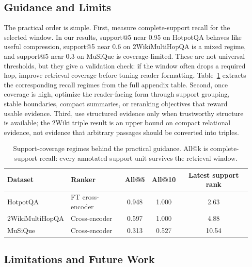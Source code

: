 \documentclass[a4paper,fleqn]{cas-sc}
\begin{document}
\subsection{Guidance and Limits}

The practical order is simple. First, measure complete-support recall for the
selected window. In our results, support@5 near 0.95 on HotpotQA behaves like
useful compression, support@5 near 0.6 on 2WikiMultiHopQA is a mixed regime,
and support@5 near 0.3 on MuSiQue is coverage-limited. These are not universal
thresholds, but they give a validation check: if the window often drops a
required hop, improve retrieval coverage before tuning reader formatting.
Table~\ref{tab:coverage-regimes} extracts the corresponding recall regimes
from the full appendix table. Second, once coverage is high, optimize the
reader-facing form through support grouping, stable boundaries, compact
summaries, or reranking objectives that reward usable evidence. Third, use
structured evidence only when trustworthy structure is available; the 2Wiki
triple result is an upper bound on compact relational evidence, not evidence
that arbitrary passages should be converted into triples.

\begin{table}[!t]
\centering
\caption{Support-coverage regimes behind the practical guidance. All@k is
complete-support recall: every annotated support unit survives the retrieval
window.}
\label{tab:coverage-regimes}
\scriptsize
\setlength{\tabcolsep}{5pt}
\begin{tabular}{llccc}
\toprule
Dataset & Ranker & All@5 & All@10 & Latest support rank \\
\midrule
HotpotQA & FT cross-encoder & 0.948 & 1.000 & 2.63 \\
2WikiMultiHopQA & Cross-encoder & 0.597 & 1.000 & 4.88 \\
MuSiQue & Cross-encoder & 0.313 & 0.527 & 10.54 \\
\bottomrule
\end{tabular}
\end{table}

\subsection{Limitations and Future Work}
\end{document}
